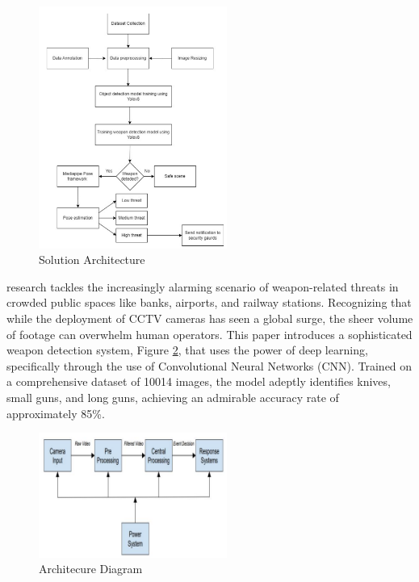 \begin{figure}[h]
    \centering 
    \includegraphics[width=0.55\textwidth]{figs/safa-architecture.png} 
    \caption{\citet{rfc17} Solution Architecture}
    \label{fig:safa-architecture}
\end{figure}


\citet{rfc6} research tackles the increasingly alarming scenario of weapon-related threats in crowded public spaces like banks, airports, and railway stations. Recognizing that while the deployment of CCTV cameras has seen a global surge, the sheer volume of footage can overwhelm human operators. This paper introduces a sophisticated weapon detection system, Figure \ref{fig:gawade-architecture},  that uses the power of deep learning, specifically through the use of Convolutional Neural Networks (CNN). Trained on a comprehensive dataset of 10014 images, the model adeptly identifies knives, small guns, and long guns, achieving an admirable accuracy rate of approximately 85\%.

\begin{figure}[h]
    \centering 
    \includegraphics[width=0.55\textwidth]{figs/Gawade-architecture.png} 
    \caption{\citet{rfc6} Architecure Diagram}
    \label{fig:gawade-architecture}
\end{figure}


